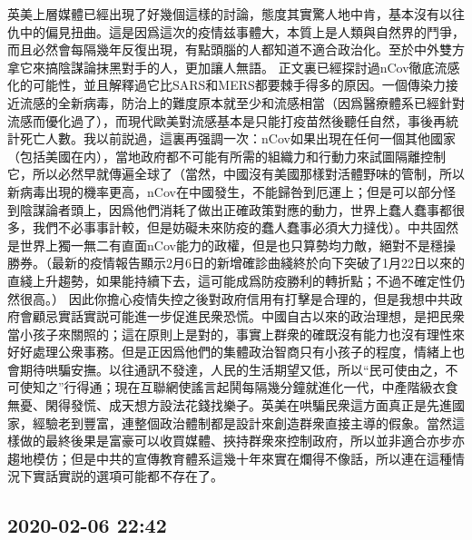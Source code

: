 \documentclass[twocolumn]{ctexart}
\begin{document}
英美上層媒體已經出現了好幾個這樣的討論，態度其實驚人地中肯，基本沒有以往仇中的偏見扭曲。這是因爲這次的疫情兹事體大，本質上是人類與自然界的鬥爭，而且必然會每隔幾年反復出現，有點頭腦的人都知道不適合政治化。至於中外雙方拿它來搞陰謀論抹黑對手的人，更加讓人無語。
正文裏已經探討過nCov徹底流感化的可能性，並且解釋過它比SARS和MERS都要棘手得多的原因。一個傳染力接近流感的全新病毒，防治上的難度原本就至少和流感相當（因爲醫療體系已經針對流感而優化過了），而現代歐美對流感基本是只能打疫苗然後聽任自然，事後再統計死亡人數。我以前説過，這裏再强調一次：nCov如果出現在任何一個其他國家（包括美國在内），當地政府都不可能有所需的組織力和行動力來試圖隔離控制它，所以必然早就傳遍全球了（當然，中國沒有美國那樣對活體野味的管制，所以新病毒出現的機率更高，nCov在中國發生，不能歸咎到厄運上；但是可以部分怪到陰謀論者頭上，因爲他們消耗了做出正確政策對應的動力，世界上蠢人蠢事都很多，我們不必事事計較，但是妨礙未來防疫的蠢人蠢事必須大力撻伐）。中共固然是世界上獨一無二有直面nCov能力的政權，但是也只算勢均力敵，絕對不是穩操勝券。（最新的疫情報告顯示2月6日的新增確診曲綫終於向下突破了1月22日以來的直綫上升趨勢，如果能持續下去，這可能成爲防疫勝利的轉折點；不過不確定性仍然很高。）
因此你擔心疫情失控之後對政府信用有打擊是合理的，但是我想中共政府會顧忌實話實説可能進一步促進民衆恐慌。中國自古以來的政治理想，是把民衆當小孩子來關照的；這在原則上是對的，事實上群衆的確既沒有能力也沒有理性來好好處理公衆事務。但是正因爲他們的集體政治智商只有小孩子的程度，情緒上也會期待哄騙安撫。以往通訊不發達，人民的生活期望又低，所以“民可使由之，不可使知之”行得通；現在互聯網使謠言起鬨每隔幾分鐘就進化一代，中產階級衣食無憂、閑得發慌、成天想方設法花錢找樂子。英美在哄騙民衆這方面真正是先進國家，經驗老到豐富，連整個政治體制都是設計來創造群衆直接主導的假象。當然這樣做的最終後果是富豪可以收買媒體、挾持群衆來控制政府，所以並非適合亦步亦趨地模仿；但是中共的宣傳教育體系這幾十年來實在爛得不像話，所以連在這種情況下實話實説的選項可能都不存在了。
\subsection*{2020-02-06 22:42}
\end{document}
